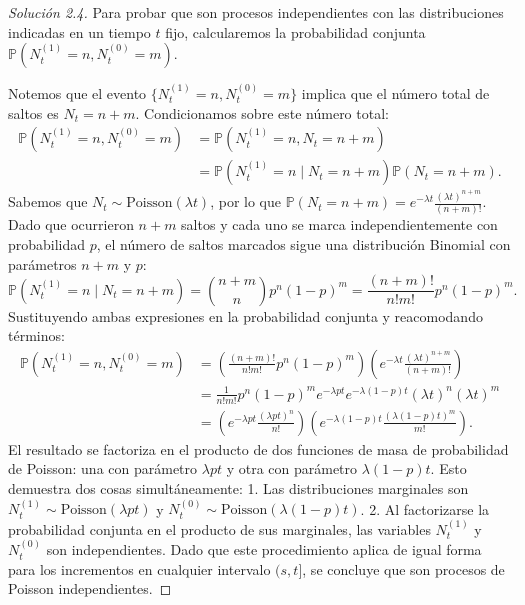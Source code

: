 \documentclass[10pt,a4paper]{article}
\begin{document}
\begin{proof}[Solución 2.4]
    Para probar que son procesos independientes con las distribuciones indicadas en un tiempo $t$ fijo, calcularemos la probabilidad conjunta $\mathbb{P}(N_t^{(1)} = n, N_t^{(0)} = m)$. 
    
    Notemos que el evento $\{N_t^{(1)} = n, N_t^{(0)} = m\}$ implica que el número total de saltos es $N_t = n + m$. Condicionamos sobre este número total:
    \begin{align*}
        \mathbb{P}(N_t^{(1)} = n, N_t^{(0)} = m) &= \mathbb{P}(N_t^{(1)} = n, N_t = n + m) \\
        &= \mathbb{P}(N_t^{(1)} = n \mid N_t = n + m) \mathbb{P}(N_t = n + m).
    \end{align*}
    Sabemos que $N_t \sim \text{Poisson}(\lambda t)$, por lo que $\mathbb{P}(N_t = n+m) = e^{-\lambda t} \frac{(\lambda t)^{n+m}}{(n+m)!}$.
    Dado que ocurrieron $n+m$ saltos y cada uno se marca independientemente con probabilidad $p$, el número de saltos marcados sigue una distribución Binomial con parámetros $n+m$ y $p$:
    \[ \mathbb{P}(N_t^{(1)} = n \mid N_t = n + m) = \binom{n+m}{n} p^n (1-p)^m = \frac{(n+m)!}{n! m!} p^n (1-p)^m. \]
    Sustituyendo ambas expresiones en la probabilidad conjunta y reacomodando términos:
    \begin{align*}
        \mathbb{P}(N_t^{(1)} = n, N_t^{(0)} = m) &= \left( \frac{(n+m)!}{n! m!} p^n (1-p)^m \right) \left( e^{-\lambda t} \frac{(\lambda t)^{n+m}}{(n+m)!} \right) \\
        &= \frac{1}{n! m!} p^n (1-p)^m e^{-\lambda p t} e^{-\lambda (1-p) t} (\lambda t)^n (\lambda t)^m \\
        &= \left( e^{-\lambda p t} \frac{(\lambda p t)^n}{n!} \right) \left( e^{-\lambda (1-p) t} \frac{(\lambda (1-p) t)^m}{m!} \right).
    \end{align*}
    El resultado se factoriza en el producto de dos funciones de masa de probabilidad de Poisson: una con parámetro $\lambda p t$ y otra con parámetro $\lambda(1-p)t$. 
    Esto demuestra dos cosas simultáneamente:
    1. Las distribuciones marginales son $N_t^{(1)} \sim \text{Poisson}(\lambda p t)$ y $N_t^{(0)} \sim \text{Poisson}(\lambda(1-p) t)$.
    2. Al factorizarse la probabilidad conjunta en el producto de sus marginales, las variables $N_t^{(1)}$ y $N_t^{(0)}$ son independientes.
    Dado que este procedimiento aplica de igual forma para los incrementos en cualquier intervalo $(s, t]$, se concluye que son procesos de Poisson independientes.
\end{proof}
\end{document}
